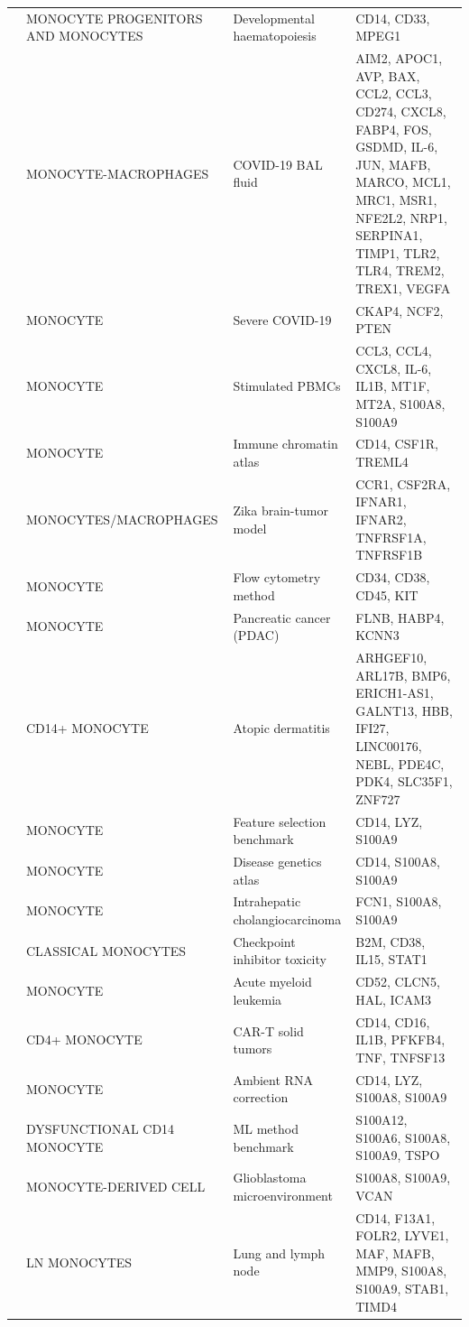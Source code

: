 \documentclass[10pt,twocolumn]{article}
\theoremstyle{plain}
\theoremstyle{definition}
\theoremstyle{remark}
\begin{document}
\begin{table}[ht!]
\begin{tabular}{@{}l p{3.6cm} p{2.7cm} p{7.1cm}@{}}
  \citep{MariaRanzoni2020biorxiv080259} & MONOCYTE PROGENITORS AND MONOCYTES & Developmental haematopoiesis & CD14, CD33, MPEG1  \\ [4pt]
  \citep{Asaba2024} & MONOCYTE-MACROPHAGES & COVID-19 BAL fluid & AIM2, APOC1, AVP, BAX, CCL2, CCL3, CD274, CXCL8, FABP4, FOS, GSDMD, IL-6, JUN, MAFB, MARCO, MCL1, MRC1, MSR1, NFE2L2, NRP1, SERPINA1, TIMP1, TLR2, TLR4, TREM2, TREX1, VEGFA  \\ [4pt]
  \citep{Gavriilidis2024} & MONOCYTE & Severe COVID-19 & CKAP4, NCF2, PTEN  \\ [4pt]
  \citep{Lawlor2020} & MONOCYTE & Stimulated PBMCs & CCL3, CCL4, CXCL8, IL-6, IL1B, MT1F, MT2A, S100A8, S100A9  \\ [4pt]
  \citep{Satpathy2019} & MONOCYTE & Immune chromatin atlas & CD14, CSF1R, TREML4  \\ [4pt]
  \citep{Sherwood2024zika} & MONOCYTES/\allowbreak MACROPHAGES & Zika brain-tumor model & CCR1, CSF2RA, IFNAR1, IFNAR2, TNFRSF1A, TNFRSF1B  \\ [4pt]
  \citep{Shemonti2025} & MONOCYTE & Flow cytometry method & CD34, CD38, CD45, KIT  \\ [4pt]
  \citep{Xu2025pdac} & MONOCYTE & Pancreatic cancer (PDAC) & FLNB, HABP4, KCNN3  \\ [4pt]
  \citep{Baldonado2025biorxiv689843} & CD14+ MONOCYTE & Atopic dermatitis & ARHGEF10, ARL17B, BMP6, ERICH1-AS1, GALNT13, HBB, IFI27, LINC00176, NEBL, PDE4C, PDK4, SLC35F1, ZNF727  \\ [4pt]
  \citep{Alkhadrawi2025} & MONOCYTE & Feature selection benchmark & CD14, LYZ, S100A9  \\ [4pt]
  \citep{Yu2024hcnetlas} & MONOCYTE & Disease genetics atlas & CD14, S100A8, S100A9  \\ [4pt]
  \citep{Wang2025icc} & MONOCYTE & Intrahepatic cholangiocarcinoma & FCN1, S100A8, S100A9  \\ [4pt]
  \citep{Zhao2022biorxiv494592} & CLASSICAL MONOCYTES & Checkpoint inhibitor toxicity & B2M, CD38, IL15, STAT1  \\ [4pt]
  \citep{Li2021aml} & MONOCYTE & Acute myeloid leukemia & CD52, CLCN5, HAL, ICAM3  \\ [4pt]
  \citep{Luo2025biorxiv676755} & CD4+ MONOCYTE & CAR-T solid tumors & CD14, CD16, IL1B, PFKFB4, TNF, TNFSF13  \\ [4pt]
  \citep{Yang2019decontx} & MONOCYTE & Ambient RNA correction & CD14, LYZ, S100A8, S100A9  \\ [4pt]
  \citep{Jeong2025biorxiv632256} & DYSFUNCTIONAL CD14 MONOCYTE & ML method benchmark & S100A12, S100A6, S100A8, S100A9, TSPO  \\ [4pt]
  \citep{Cheng2024glio} & MONOCYTE-DERIVED CELL & Glioblastoma microenvironment & S100A8, S100A9, VCAN  \\ [4pt]
  \citep{Leach2020biorxiv070839} & LN MONOCYTES & Lung and lymph node & CD14, F13A1, FOLR2, LYVE1, MAF, MAFB, MMP9, S100A8, S100A9, STAB1, TIMD4  \\ [4pt]
  \bottomrule
  \end{tabular}
\end{table}
\end{document}
